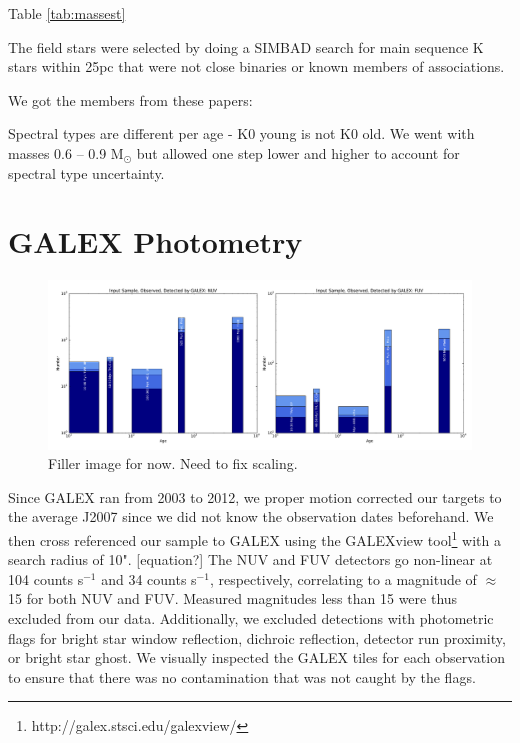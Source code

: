 \documentclass[twocolumn]{aastex62}
\begin{document}
Table \ref{tab:massest}


The field stars were selected by doing a SIMBAD search for main sequence K stars within 25pc that were not close binaries or known members of associations. 




We got the members from these papers:

Spectral types are different per age - K0 young is not K0 old. We went with masses 0.6 -- 0.9 M$_{\odot}$ but allowed one step lower and higher to account for spectral type uncertainty.





\section{GALEX Photometry}\label{sec:photometry}

\begin{figure}[t]
\includegraphics[width=\linewidth]{galex_observations.pdf}
\caption{Filler image for now. Need to fix scaling. \label{fig:galex_observations}}
\end{figure}


Since GALEX ran from 2003 to 2012, we proper motion corrected our targets to the average J2007 since we did not know the observation dates beforehand. We then cross referenced our sample to GALEX using the GALEXview tool\footnote{http://galex.stsci.edu/galexview/} with a search radius of 10". [equation?] The NUV and FUV detectors go non-linear at 104 counts s$^{-1}$ and 34 counts s$^{-1}$, respectively, correlating to a magnitude of $\approx$15 for both NUV and FUV. Measured magnitudes less than 15 were thus excluded from our data. Additionally, we excluded detections with photometric flags for bright star window reflection, dichroic reflection, detector run proximity, or bright star ghost. We visually inspected the GALEX tiles for each observation to ensure that there was no contamination that was not caught by the flags. 
\end{document}
